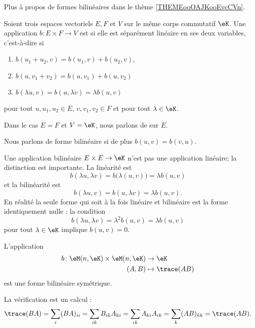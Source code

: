 Plus à propos de formes bilinéaires dans le thème \ref{THEMEooOAJKooEvcCVn}.

\begin{definition}      \label{DEFooEEQGooNiPjHz}
    Soient trois espaces vectoriels \( E,F\) et \( V\) sur le même corps commutatif \( \eK\). Une application \( b\colon E\times F\to V\) est  si elle est séparément linéaire en ses deux variables, c'est-à-dire si
    \begin{enumerate}
        \item 
            \( b(u_1+u_2,v)=b(u_1,v)+b(u_2,v)\),
        \item
            \( b(u,v_1+v_2)=b(u,v_1)+b(u,v_2)\)
        \item
            \( b(\lambda u,v)=b(u,\lambda v)=\lambda b(u,v)\)
    \end{enumerate}
    pour tout \( u,u_1,u_2\in E\), \( v,v_1,v_2\in F\) et pour tout \( \lambda\in \eK\).

    Dans le cas \( E=F\) et \( V=\eK\), nous parlons de  sur \( E\).

    Nous parlons de forme bilinéaire  si de plus \( b(u,v)=b(v,u)\).
\end{definition}

\begin{normaltext}
    Une application bilinéaire \( E\times E\to \eK\) n'est pas une application linéaire; la distinction est importante. La linéarité est
    \begin{equation}
        b(\lambda u,\lambda v)= b\big( \lambda(u,v) \big)=\lambda b(u,v)
    \end{equation}
    et la bilinéarité est
    \begin{equation}
        b(\lambda u,v)=b(u,\lambda v)=\lambda b(u,v).
    \end{equation}
    En réalité la seule forme qui soit à la fois linéaire et bilinéaire est la forme identiquement nulle : la condition
    \begin{equation}
        b(\lambda u,\lambda v)=\lambda^2b(u,v)=\lambda b(u,v)
    \end{equation}
    pour tout \( \lambda\in \eK\) implique \( b(u,v)=0\).
\end{normaltext}

\begin{example}
    L'application
    \begin{equation}
        \begin{aligned}
            b\colon \eM(n,\eK)\times \eM(n,\eK)&\to \eK \\
            (A,B)&\mapsto \trace(AB) 
        \end{aligned}
    \end{equation}
    est une forme bilinéaire symétrique.

    La vérification est un calcul :
    \begin{equation}
        \trace(BA)=\sum_{i}(BA)_{ii}=\sum_{ik}B_{ik}A_{ki}=\sum_{ik}A_{ki}A_{ik}=\sum_k(AB)_{kk}=\trace(AB).
    \end{equation}
\end{example}

